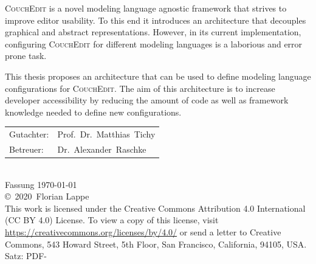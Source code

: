 \documentclass[
a4paper,
headsepline,           %
numbers=noenddot,      %
bibliography=totoc,              %
BCOR=15mm,               %
leqno,					%
]{scrbook}
\newcommand{\fullname}{Florian Lappe}
\newcommand{\jahr}{2020}
\newcommand{\gutachterA}{Prof.\ Dr.\ Matthias\ Tichy}
\newcommand{\betreuer}{Dr.\ Alexander\ Raschke}
\begin{document}
\textsc{CouchEdit} is a novel modeling language agnostic framework that strives to improve editor usability. To this end it introduces an architecture that decouples graphical and abstract representations. However, in its current implementation, configuring \textsc{CouchEdit} for different modeling languages is a laborious and error prone task.

This thesis proposes an architecture that can be used to define modeling language configurations for \textsc{CouchEdit}. The aim of this architecture is to increase developer accessibility by reducing the amount of code as well as framework knowledge needed to define new configurations. 

  {
    \null
    \small
    \vfill
    \begin{center}
      \begin{tabular}{l l}
        Gutachter: & \gutachterA \\
        Betreuer:  & \betreuer   \\
      \end{tabular}\\[1cm]
      Fassung \today\\
      \copyright~\jahr~\fullname\\[0.5em]
      This work is licensed under the Creative Commons Attribution 4.0 International (CC BY 4.0) License. To view a copy of this license, visit \href{https://creativecommons.org/licenses/by/4.0/}{https://creativecommons.org/licenses/by/4.0/} or send a letter to Creative Commons, 543 Howard Street, 5th Floor, San Francisco, California, 94105, USA. \\

      Satz: PDF-\LaTeXe
    \end{center}
  }


\tableofcontents

\mainmatter %









\end{document}
